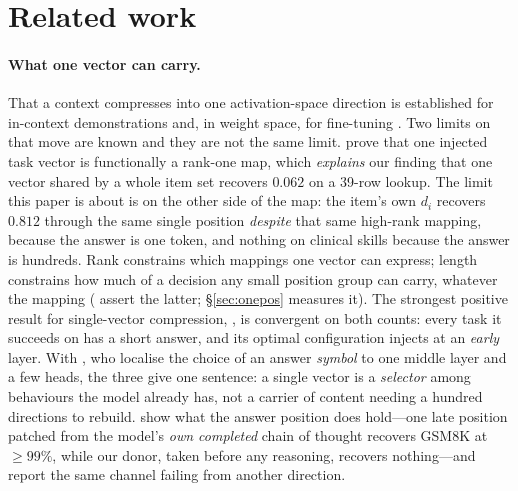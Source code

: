 \documentclass{article}
\newcommand{\dvec}{\ensuremath{d}}
\begin{document}
\section{Related work}

\paragraph{What one vector can carry.} That a context compresses into one
activation-space direction is established for in-context demonstrations
\citep{hendel2023taskvectors, todd2024functionvectors} and, in weight space, for
fine-tuning \citep{ilharco2023taskarithmetic}. Two limits on that move are
known and they are not the same limit. \citet{dong2026taskvectorlimits} prove
that one injected task vector is functionally a rank-one map, which
\emph{explains} our finding that one vector shared by a whole item set recovers
$0.062$ on a 39-row lookup. The limit this paper is about is on the other side
of the map: the item's own $\dvec_i$ recovers $0.812$ through the same single
position \emph{despite} that same high-rank mapping, because the answer is one
token, and nothing on clinical skills because the answer is hundreds. Rank
constrains which mappings one vector can express; length constrains how much of
a decision any small position group can carry, whatever the mapping
(\citealp{dura2026sequentialpatching} assert the latter; \S\ref{sec:onepos}
measures it). The strongest positive result for single-vector compression,
\citet{ardoin2026promptcompression}, is convergent on both counts: every task it
succeeds on has a short answer, and its optimal configuration injects at an
\emph{early} layer. With \citet{wiegreffe2025mcq}, who localise the choice of an
answer \emph{symbol} to one middle layer and a few heads, the three give one
sentence: a single vector is a \emph{selector} among behaviours the model
already has, not a carrier of content needing a hundred directions to rebuild.
\citet{mehrafarin2026cothidden} show what the answer position does hold---one
late position patched from the model's \emph{own completed} chain of thought
recovers GSM8K at $\ge99\%$, while our donor, taken before any reasoning,
recovers nothing---and \citet{dasilva2025steeringoff} report the same channel
failing from another direction.
\end{document}
